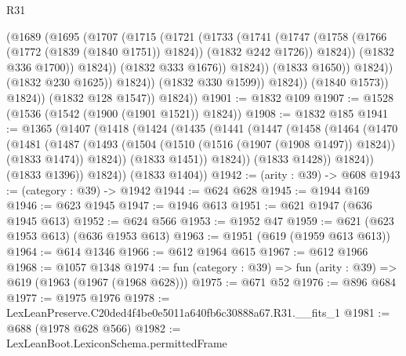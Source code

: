 \begin{lexlean}{R31}
\begin{coremodule}
                                  (@1689
                                    (@1695
                                      (@1707
                                        (@1715
                                          (@1721
                                            (@1733
                                              (@1741
                                                (@1747
                                                  (@1758
                                                    (@1766 (@1772 (@1839 (@1840 @1751)) @1824))
                                                    (@1832 @242 @1726))
                                                  @1824))
                                              (@1832 @336 @1700))
                                            @1824))
                                        (@1832 @333 @1676))
                                      @1824))
                                  (@1833 @1650))
                                @1824))
                            (@1832 @230 @1625))
                          @1824))
                      (@1832 @330 @1599))
                    @1824))
                (@1840 @1573))
              @1824))
          (@1832 @128 @1547))
        @1824))
@1901 := @1832 @109
@1907 := @1528 (@1536 (@1542 (@1900 (@1901 @1521)) @1824))
@1908 := @1832 @185
@1941 := @1365
    (@1407
      (@1418
        (@1424
          (@1435
            (@1441
              (@1447
                (@1458
                  (@1464
                    (@1470
                      (@1481
                        (@1487
                          (@1493
                            (@1504 (@1510 (@1516 (@1907 (@1908 @1497)) @1824)) (@1833 @1474))
                            @1824))
                        (@1833 @1451))
                      @1824))
                  (@1833 @1428))
                @1824))
            (@1833 @1396))
          @1824))
      (@1833 @1404))
@1942 := (arity : @39) -> @608
@1943 := (category : @39) -> @1942
@1944 := @624 @628
@1945 := @1944 @169
@1946 := @623 @1945
@1947 := @1946 @613
@1951 := @621 @1947 (@636 @1945 @613)
@1952 := @624 @566
@1953 := @1952 @47
@1959 := @621 (@623 @1953 @613) (@636 @1953 @613)
@1963 := @1951 (@619 (@1959 @613 @613))
@1964 := @614 @1346
@1966 := @612 @1964 @615
@1967 := @612 @1966
@1968 := @1057 @1348
@1974 := fun (category : @39) => fun (arity : @39) => @619 (@1963 (@1967 (@1968 @628)))
@1975 := @671 @52
@1976 := @896 @684
@1977 := @1975 @1976
@1978 := LexLeanPreserve.C20ded4f4be0e5011a640fb6c30888a67.R31.__fits_1
@1981 := @688 (@1978 @628 @566)
@1982 := LexLeanBoot.LexiconSchema.permittedFrame

\end{coremodule}
\end{lexlean}

